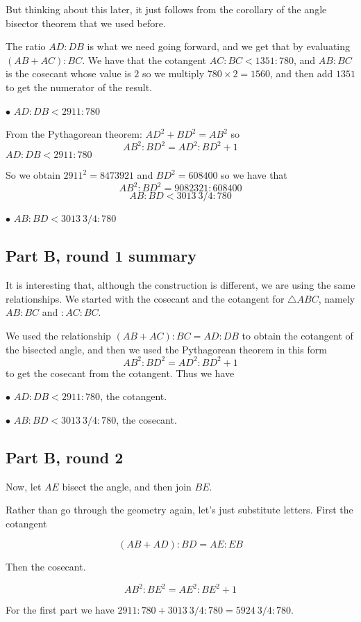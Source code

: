 \documentclass[11pt, oneside]{article}
\begin{document}
But thinking about this later, it just follows from the corollary of the angle bisector theorem that we used before.

The ratio $AD:DB$ is what we need going forward, and we get that by evaluating  $(AB + AC):BC$.  We have that the cotangent $AC : BC < 1351 : 780$, and $AB:BC$ is the cosecant whose value is $2$ so we multiply $780 \times 2 = 1560$, and then add $1351$ to get the numerator of the result.

$\bullet$  $AD : DB < 2911 : 780$

From the Pythagorean theorem:  $AD^2 + BD^2 = AB^2$ so
\[ AB^2:BD^2 = AD^2:BD^2 + 1 \]
$AD : DB < 2911 : 780$  

So we obtain $2911^2 = 8473921$ and $BD^2 = 608400$ so we have that
\[ AB^2:BD^2 =  9082321: 608400 \]
\[ AB:BD <  3013 \ 3/4: 780 \]

$\bullet$  $AB : BD < 3013 \ 3/4 : 780$

\subsection*{Part B, round 1 summary}
It is interesting that, although the construction is different, we are using the same relationships.  We started with the cosecant and the cotangent for $\triangle ABC$, namely $AB:BC$ and $:AC:BC$.

We used the relationship $(AB + AC):BC = AD:DB$ to obtain the cotangent of the bisected angle, and then we used the Pythagorean theorem in this form
\[ AB^2:BD^2 = AD^2:BD^2 + 1 \]
to get the cosecant from the cotangent.  Thus we have

$\bullet$  $AD : DB < 2911 : 780$, the cotangent.

$\bullet$  $AB : BD < 3013 \ 3/4 : 780$, the cosecant.

\subsection*{Part B, round 2}

Now, let $AE$ bisect the angle, and then join $BE$.

Rather than go through the geometry again, let's just substitute letters.  First the cotangent

\[ (AB + AD):BD = AE:EB \]

Then the cosecant.

\[ AB^2:BE^2 = AE^2:BE^2 + 1 \]

For the first part we have $2911:780 + 3013 \ 3/4:780 = 5924 \ 3/4:780$.  
\end{document}
